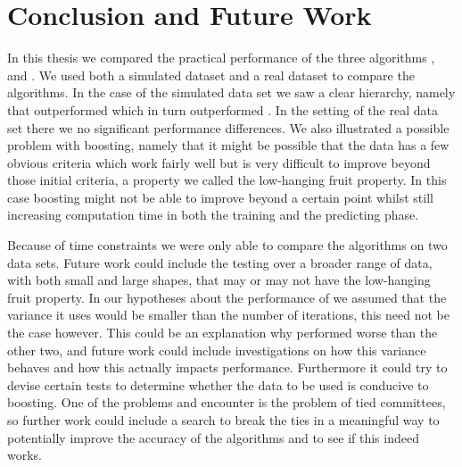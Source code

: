 
\chapter{Conclusion and Future Work} 
\label{sec:Concl}

In this thesis we compared the practical performance of the three algorithms \adaB, \NHB and \squintB.  We used both a simulated dataset and a real dataset to compare the algorithms. In the case of the simulated data set we saw a clear hierarchy, namely that \NHB outperformed \adaB which in turn outperformed \squintB. In the setting of the real data set  there we no significant performance differences.
We also illustrated a possible problem with boosting, namely that it might be possible that the data has a few obvious criteria which work fairly well but is very difficult to improve beyond those initial criteria, a property we called the low-hanging fruit property. In this case boosting might not be able to improve beyond a certain point whilst still increasing computation time in both the training and the predicting phase. 

\par Because of time constraints we were only able to compare the algorithms on two data sets. Future work could include the testing over a broader range of data, with both small and large shapes, that may or may not have the low-hanging fruit property. In our hypotheses about the performance of \squintB we assumed that the variance it uses would be smaller than the number of iterations, this need not be the case however. This could be an explanation why \squinB performed worse than the other two, and future work could include investigations on how this variance behaves and how this actually impacts performance. Furthermore it could try to devise certain tests to determine whether the data to be used is conducive to boosting. One of the problems \squintB and \NHB encounter is the problem of tied committees, so further work could include a search to break the ties in a meaningful way to potentially improve the accuracy of the algorithms and to see if this indeed works.
